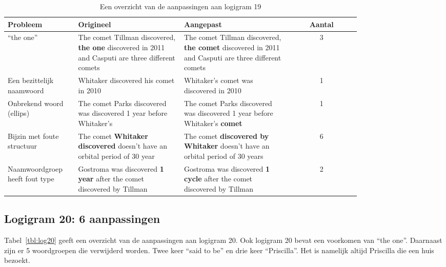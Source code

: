 \begin{table}[h]
  \centering
  \begin{tabular}{p{0.2\linewidth}p{0.3\linewidth}p{0.3\linewidth}c}
    \toprule
    \textbf{Probleem} & \textbf{Origineel} & \textbf{Aangepast} & \textbf{Aantal} \\ 
    \hline
    ``the one'' & The comet Tillman discovered, \textbf{the one} discovered in 2011 and Casputi are three different comets & The comet Tillman discovered, \textbf{the comet} discovered in 2011 and Casputi are three different comets & 3 \\
    \hline
    Een bezittelijk naamwoord & Whitaker discovered his comet in 2010 & Whitaker's comet was discovered in 2010 & 1 \\
    \hline
    Onbrekend woord (ellips) & The comet Parks discovered was discovered 1 year before Whitaker's & The comet Parks discovered was discovered 1 year before Whitaker's \textbf{comet} & 1 \\
    \hline
    Bijzin met foute structuur & The comet \textbf{Whitaker discovered} doesn't have an orbital period of 30 year & The comet \textbf{discovered by Whitaker} doesn't have an orbital period of 30 years & 6 \\
    \hline
    Naamwoordgroep heeft fout type & Gostroma was discovered \textbf{1 year} after the comet discovered by Tillman & Gostroma was discovered \textbf{1 cycle} after the comet discovered by Tillman & 2 \\
    \bottomrule
  \end{tabular}
  \caption{Een overzicht van de aanpassingen aan logigram 19}
  \label{tbl:log19}
\end{table}

\subsection{Logigram 20: 6 aanpassingen}
Tabel~\ref{tbl:log20} geeft een overzicht van de aanpassingen aan logigram 20. Ook logigram 20 bevat een voorkomen van ``the one''. Daarnaast zijn er 5 woordgroepen die verwijderd worden. Twee keer ``said to be'' en drie keer ``Priscilla''. Het is namelijk altijd Priscilla die een huis bezoekt.

